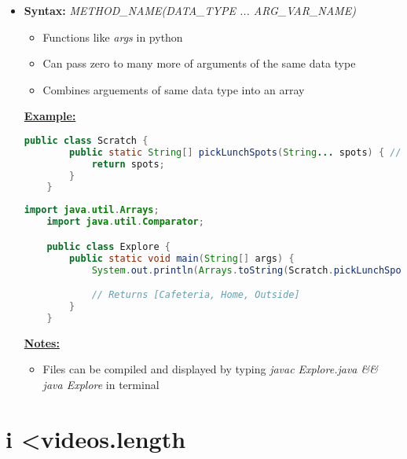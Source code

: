 \documentclass[12pt]{article}
\begin{document}
\begin{itemize}
    \item \textbf{Syntax:} \textit{METHOD\_NAME(DATA\_TYPE ... ARG\_VAR\_NAME)}
    \begin{itemize}
        \item Functions like \textit{args} in python
        \item Can pass zero to many more of arguments of the same data type
        \item Combines arguements of same data type into an array
    \end{itemize}

    \bigskip

    \underline{\textbf{Example:}}

    \bigskip

    \begin{lstlisting}[language=Java, caption={lesson\_05/Scratch.java}]
    public class Scratch {
        public static String[] pickLunchSpots(String... spots) { // <- This guy here :)
            return spots;
        }
    }
    \end{lstlisting}

    \begin{lstlisting}[language=Java, caption={lesson\_05/Explore.java}]
    import java.util.Arrays;
    import java.util.Comparator;

    public class Explore {
        public static void main(String[] args) {
            System.out.println(Arrays.toString(Scratch.pickLunchSpots("Cafeteria", "Home", "Outside")));

            // Returns [Cafeteria, Home, Outside]
        }
    }
    \end{lstlisting}

    \bigskip

    \underline{\textbf{Notes:}}

    \bigskip

    \begin{itemize}
        \item Files can be compiled and displayed by typing \textit{javac Explore.java \&\& java Explore}
        in terminal
    \end{itemize}
\end{itemize}

\bigskip

\section{i \textless videos.length}
\end{document}
